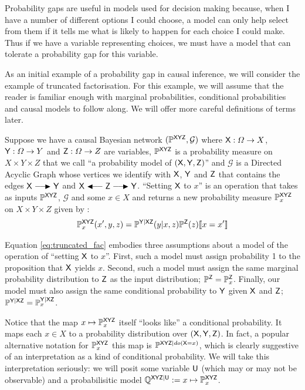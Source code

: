Probability gaps are useful in models used for decision making because, when I have a number of different options I could choose, a model can only help select from them if it tells me what is likely to happen for each choice I could make. Thus if we have a variable representing choices, we must have a model that can tolerate a probability gap for this variable.

As an initial example of a probability gap in causal inference, we will consider the example of truncated factorisation. For this example, we will assume that the reader is familiar enough with marginal probabilities, conditional probabilities and causal models to follow along. We will offer more careful definitions of terms later.

Suppose we have a causal Bayesian network $(\mathbb{P}^{\mathsf{XYZ}},\mathcal{G})$ where $\mathsf{X}:\Omega\to X$, $\mathsf{Y}:\Omega\to Y$ and $\mathsf{Z}:\Omega\to Z$ are variables, $\mathbb{P}^{\mathsf{XYZ}}$ is a probability measure on $X\times Y\times Z$ that we call ``a probability model of $(\mathsf{X},\mathsf{Y},\mathsf{Z})$'' and $\mathcal{G}$ is a Directed Acyclic Graph whose vertices we identify with $\mathsf{X}$, $\mathsf{Y}$ and $\mathsf{Z}$ that contains the edges $\RV{X}\longrightarrowRHD \RV{Y}$ and $\RV{X}\longleftarrowRHD \RV{Z} \longrightarrowRHD \RV{Y}$. ``Setting $\mathsf{X}$ to $x$'' is an operation that takes as inputs $\mathbb{P}^{\mathsf{XYZ}}$, $\mathcal{G}$ and some $x\in X$ and returns a new probability measure $\mathbb{P}_x^{\mathsf{XYZ}}$ on $X\times Y\times Z$ given by \citep[page ~24]{pearl_causality:_2009}:
\begin{align}
	\mathbb{P}^{\mathsf{XYZ}}_{x}(x',y,z)=\mathbb{P}^{\mathsf{Y|XZ}}(y|x,z)\mathbb{P}^{\mathsf{Z}}(z)\llbracket x=x' \rrbracket\label{eq:truncated_fac}
\end{align}

Equation \ref{eq:truncated_fac} embodies three assumptions about a model of the operation of ``setting $\mathsf{X}$ to $x$''. First, such a model must assign probability 1 to the proposition that $\mathsf{X}$ yields $x$. Second, such a model must assign the same marginal probability distribution to $\mathsf{Z}$ as the input distribution; $\mathbb{P}^{\mathsf{Z}}=\mathbb{P}_{x}^{\mathsf{Z}}$. Finally, our model must also assign the same conditional probability to $\mathsf{Y}$ given $\mathsf{X}$ and $\mathsf{Z}$; $\mathbb{P}^{\mathsf{Y}|\mathsf{XZ}}=\mathbb{P}_x^{\mathsf{Y}|\mathsf{XZ}}$.

Notice that the map $x\mapsto \mathbb{P}^{\mathsf{XYZ}}_x$ itself ``looks like'' a conditional probability. It maps each $x\in X$ to a probability distribution over $(\mathsf{X},\mathsf{Y},\mathsf{Z})$. In fact, a popular alternative notation for $\mathbb{P}^{\mathsf{XYZ}}_x$ this map is $\mathbb{P}^{\mathsf{XYZ}|do(\mathsf{X}=x)}$, which is clearly suggestive of an interpretation as a kind of conditional probability. We will take this interpretation seriously: we will posit some variable $\mathsf{U}$ (which may or may not be observable) and a probabilisitic model $\mathbb{Q}^{\mathsf{XYZ}|\mathsf{U}}:=x\mapsto \mathbb{P}^{\mathsf{XYZ}}_x$.


